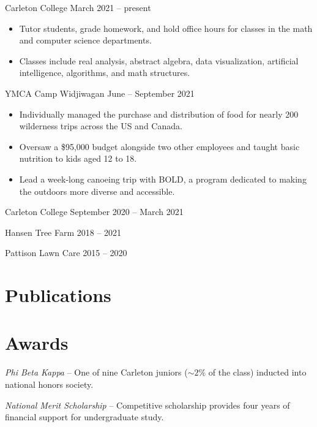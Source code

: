 \documentclass{ali-resume}
\begin{document}
{Carleton College}
{March 2021 -- present}

\begin{itemize}
	\item Tutor students, grade homework, and hold office hours for classes in the math and computer science departments.
	\item Classes include
	      real analysis, %
	      abstract algebra, %
	      data visualization, %
	      artificial intelligence, %
	      algorithms, %
	      and math structures. %
\end{itemize}

{YMCA Camp Widjiwagan}
{June -- September 2021}

\begin{itemize}
	\item Individually managed the purchase and distribution of food for nearly 200 wilderness trips across the US and Canada.
	\item Oversaw a \$95,000 budget alongside two other employees and taught basic nutrition to kids aged 12 to 18.
	\item Lead a week-long canoeing trip with BOLD, a program dedicated to making the outdoors more diverse and accessible.
\end{itemize}

{Carleton College}
{September 2020 -- March 2021}

{Hansen Tree Farm}
{2018 -- 2021}

{Pattison Lawn Care}
{2015 -- 2020}

\null

\section{Publications}


\section{Awards}

\textit{Phi Beta Kappa} -- One of nine Carleton juniors ($\sim 2\%$ of the class) inducted into national honors society.

\textit{National Merit Scholarship} -- Competitive scholarship provides four years of financial support for undergraduate study.
\end{document}
